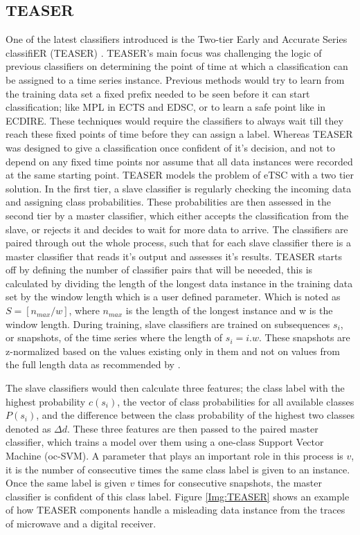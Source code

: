 \subsection{TEASER}
\label{SubsectionTEASER}
One of the latest classifiers introduced is the Two-tier Early and Accurate Series classifiER (TEASER) \cite{schafer2020teaser}.
TEASER's main focus was challenging the logic of previous classifiers on determining the point of time at which a classification can be assigned to a time series instance.
Previous methods would try to learn from the training data set a fixed prefix needed to be seen before it can start classification; like MPL in ECTS and EDSC, or to learn a safe point like in ECDIRE.
These techniques would require the classifiers to always wait till they reach these fixed points of time before they can assign a label.
Whereas TEASER was designed to give a classification once confident of it's decision, and not to depend on any fixed time points nor assume that all data instances were recorded
at the same starting point.
TEASER models the problem of eTSC with a two tier solution. In the first tier, a slave classifier is regularly checking the incoming data and assigning class probabilities.
These probabilities are then assessed in the second tier by a master classifier, which either accepts the classification from the slave, or rejects it and decides to wait for more data to arrive.
The classifiers are paired through out the whole process, such that for each slave classifier there is a master classifier that reads it's output and assesses it's results.
TEASER starts off by defining the number of classifier pairs that will be neeeded, this is calculated by dividing the length of the longest data instance in the training data set
by the window length which is a user defined parameter. Which is noted as $S = [n_{max}/w]$, where $n_{max}$ is the length of the longest instance and w is the window length.
During training, slave classifiers are trained on subsequences $s_{i}$, or snapshots, of the time series where the length of $s_{i} = i . w $. These snapshots are z-normalized based on
the values existing only in them and not on values from the full length data as recommended by \cite{mori2017early}.

The slave classifiers would then calculate three features; the class label with the highest probability $c(s_{i})$, the vector of class probabilities for all available classes $P(s_{i})$,
and the difference between the class probability of the highest two classes denoted as $\Delta d$.
These three features are then passed to the paired master classifier, which trains a model over them using a one-class Support Vector Machine (oc-SVM).
A parameter that plays an important role in this process is $v$, it is the number of consecutive times the same class label is given to an instance.
Once the same label is given $v$ times for consecutive snapshots, the master classifier is confident of this class label.
Figure \ref{Img:TEASER} shows an example of how TEASER components handle a misleading data instance from the traces of microwave and a digital receiver.

